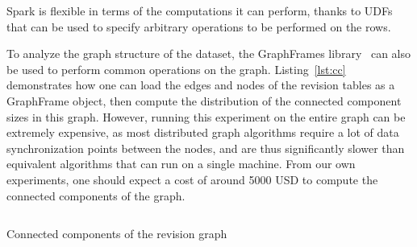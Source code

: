 Spark is flexible in terms of the computations it can perform, thanks to
\glspl{UDF}~\cite{armbrust2015spark} that can be used to specify
arbitrary operations to be performed on the rows.

To analyze the graph structure of the dataset, the GraphFrames
library~\cite{dave2016graphframes} can also be used to perform common
operations on the graph. Listing~\ref{lst:cc} demonstrates how one can load the
edges and nodes of the revision tables as a GraphFrame object, then compute the
distribution of the connected component sizes in this graph. However, running
this experiment on the entire graph can be extremely expensive, as most
distributed graph algorithms require a lot of data synchronization points
between the nodes, and are thus significantly slower than equivalent algorithms
that can run on a single machine. From our own experiments, one should expect a
cost of around \num{5000} USD to compute the connected components of the graph.

\begin{listing}
    \inputminted{python}{codesamples/graph-dataset/spark-cc.py}
    \caption{Connected components of the revision graph}%
    \label{lst:cc}
\end{listing}
